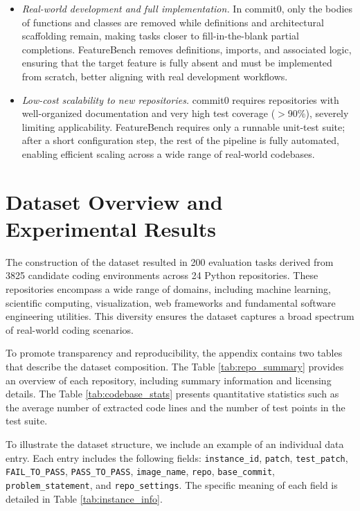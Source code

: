 \documentclass{article}
\def\name{FeatureBench }
\begin{document}
\begin{itemize}[leftmargin=12pt,itemindent=0pt]
    \setlength{\itemsep}{3pt}
    \setlength{\parsep}{0pt}
    \setlength{\parskip}{0pt}
    \item \textit{Real-world development and full implementation.}
    In commit0, only the bodies of functions and classes are removed while definitions and architectural scaffolding remain, making tasks closer to fill-in-the-blank partial completions. \name removes definitions, imports, and associated logic, ensuring that the target feature is fully absent and must be implemented from scratch, better aligning with real development workflows.

    \item \textit{Low-cost scalability to new repositories.}
    commit0 requires repositories with well-organized documentation and very high test coverage ($>$90\%), severely limiting applicability. \name requires only a runnable unit-test suite; after a short configuration step, the rest of the pipeline is fully automated, enabling efficient scaling across a wide range of real-world codebases.
\end{itemize}

\section{Dataset Overview and Experimental Results}
The construction of the dataset resulted in 200 evaluation tasks derived from 3825 candidate coding environments across 24 Python repositories. These repositories encompass a wide range of domains,  including machine learning, scientific computing, visualization, web frameworks and fundamental software engineering utilities. This diversity ensures the dataset captures a broad spectrum of real-world coding scenarios. 

To promote transparency and reproducibility, the appendix contains two tables that describe the dataset composition. The Table \ref{tab:repo_summary} provides an overview of each repository, including summary information and licensing details. The Table \ref{tab:codebase_stats} presents quantitative statistics such as the average number of extracted code lines and the number of test points in the test suite.

To illustrate the dataset structure, we include an example of an individual data entry. Each entry includes the following fields: \texttt{instance\_id}, \texttt{patch}, \texttt{test\_patch}, \texttt{FAIL\_TO\_PASS}, \texttt{PASS\_TO\_PASS}, \texttt{image\_name}, \texttt{repo}, \texttt{base\_commit}, \texttt{problem\_statement}, and \texttt{repo\_settings}. The specific meaning of each field is detailed in Table \ref{tab:instance_info}.
\end{document}
